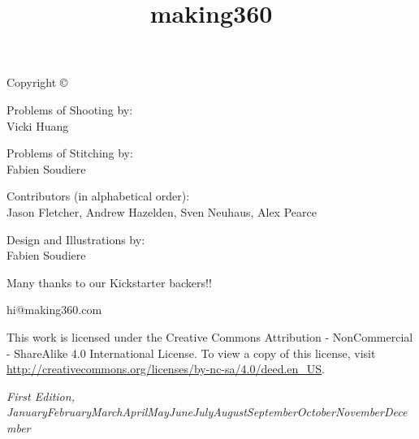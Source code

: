 \documentclass[notoc, justified]{tufte-book}
\title{making360} %
\author{} %
\newcommand{\monthyear}{\ifcase\month\or January\or February\or March\or April\or May\or June\or July\or August\or September\or October\or November\or December\fi\space\number\year} %
\begin{document}
\setlength{\parskip}{12pt}
\setlength{\parindent}{0pt}
\let\cleardoublepage\clearpage


\frontmatter


\maketitlepage


\newpage
\thispagestyle{empty}
\setlength{\parindent}{0pt}
\setlength{\parskip}{\baselineskip}
Copyright \copyright\ \the\year\ \thanklessauthor


\begin{fullwidth}

\par{Problems of Shooting by:
\\
Vicki Huang}

\par{Problems of Stitching by:
\\
Fabien Soudiere}

\par{Contributors (in alphabetical order):
\\
Jason Fletcher, Andrew Hazelden, Sven Neuhaus, Alex Pearce}

\par{Design and Illustrations by: 
\\
Fabien Soudiere}

\par{Many thanks to our Kickstarter backers!!}

\par{hi@making360.com}

\par This work is licensed under the Creative Commons Attribution - NonCommercial - ShareAlike 4.0 International License. To view a copy of this license, visit \url{http://creativecommons.org/licenses/by-nc-sa/4.0/deed.en_US}.

\par\textit{First Edition, \monthyear}
\end{fullwidth}
\clearpage


\end{document}
